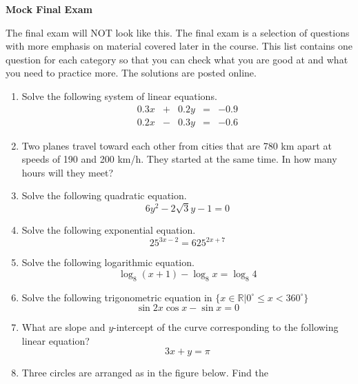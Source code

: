 \documentclass[11pt]{article}
\begin{document}
\textbf{Mock Final Exam}

The final exam will NOT look like this. The final exam is a selection
of questions with more emphasis on material covered later in the
course. This list contains one question for each category so that you
can check what you are good at and what you need to practice more. The
solutions are posted online.

\begin{enumerate}
\item Solve the following system of linear equations.
  \begin{equation}
    \label{eq:oedeoyai}
    \begin{array}{lclcr}
      0.3x & + & 0.2y & = & -0.9 \\
      0.2x & - & 0.3y & = & -0.6
    \end{array}
  \end{equation}
\item Two planes travel toward each other from cities that are 780 km
  apart at speeds of 190 and 200 km/h. They started at the same time.
  In how many hours will they meet?
\item Solve the following quadratic equation.
  \begin{equation}
    \label{eq:eishahji}
    6y^{2}-2\sqrt{3}y-1=0
  \end{equation}
\item Solve the following exponential equation.
  \begin{equation}
    \label{eq:vohtovuj}
    25^{3x-2}=625^{2x+7}
  \end{equation}
\item Solve the following logarithmic equation.
  \begin{equation}
    \label{eq:laishedu}
    \log_{8}(x+1)-\log_{8}x=\log_{8}4
  \end{equation}
\item Solve the following trigonometric equation in $\{x\in\mathbb{R}|0^{\circ}\leq{}x<360^{\circ}\}$
  \begin{equation}
    \label{eq:iegheovi}
    \sin{}2x\cos{}x-\sin{}x=0    
  \end{equation}
\item What are slope and $y$-intercept of the curve corresponding to
  the following linear equation?
  \begin{equation}
    \label{eq:eopifeek}
    3x+y=\pi
  \end{equation}
\item Three circles are arranged as in the figure below. Find the

\end{enumerate}
\end{document}
